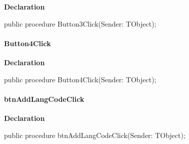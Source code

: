 \documentclass{report}
\newif\ifpdf
\begin{document}
\label{prjwizard.TfrmProjectWizard-Button3Click}
\begin{list}{}{
\setlength{\itemindent}{0cm}
\setlength{\listparindent}{0cm}
\setlength{\leftmargin}{\evensidemargin}
\addtolength{\leftmargin}{\tmplength}
\settowidth{\labelsep}{X}
\addtolength{\leftmargin}{\labelsep}
\setlength{\labelwidth}{\tmplength}
}
\item[\textbf{Declaration}\hfill]
\ifpdf
\begin{flushleft}
\fi
\begin{ttfamily}
public procedure Button3Click(Sender: TObject);\end{ttfamily}

\ifpdf
\end{flushleft}
\fi

\end{list}
\paragraph*{Button4Click}\hspace*{\fill}

\label{prjwizard.TfrmProjectWizard-Button4Click}
\begin{list}{}{
\setlength{\itemindent}{0cm}
\setlength{\listparindent}{0cm}
\setlength{\leftmargin}{\evensidemargin}
\addtolength{\leftmargin}{\tmplength}
\settowidth{\labelsep}{X}
\addtolength{\leftmargin}{\labelsep}
\setlength{\labelwidth}{\tmplength}
}
\item[\textbf{Declaration}\hfill]
\ifpdf
\begin{flushleft}
\fi
\begin{ttfamily}
public procedure Button4Click(Sender: TObject);\end{ttfamily}

\ifpdf
\end{flushleft}
\fi

\end{list}
\paragraph*{btnAddLangCodeClick}\hspace*{\fill}

\label{prjwizard.TfrmProjectWizard-btnAddLangCodeClick}
\begin{list}{}{
\setlength{\itemindent}{0cm}
\setlength{\listparindent}{0cm}
\setlength{\leftmargin}{\evensidemargin}
\addtolength{\leftmargin}{\tmplength}
\settowidth{\labelsep}{X}
\addtolength{\leftmargin}{\labelsep}
\setlength{\labelwidth}{\tmplength}
}
\item[\textbf{Declaration}\hfill]
\ifpdf
\begin{flushleft}
\fi
\begin{ttfamily}
public procedure btnAddLangCodeClick(Sender: TObject);\end{ttfamily}

\ifpdf
\end{flushleft}
\fi

\end{list}
\end{document}
